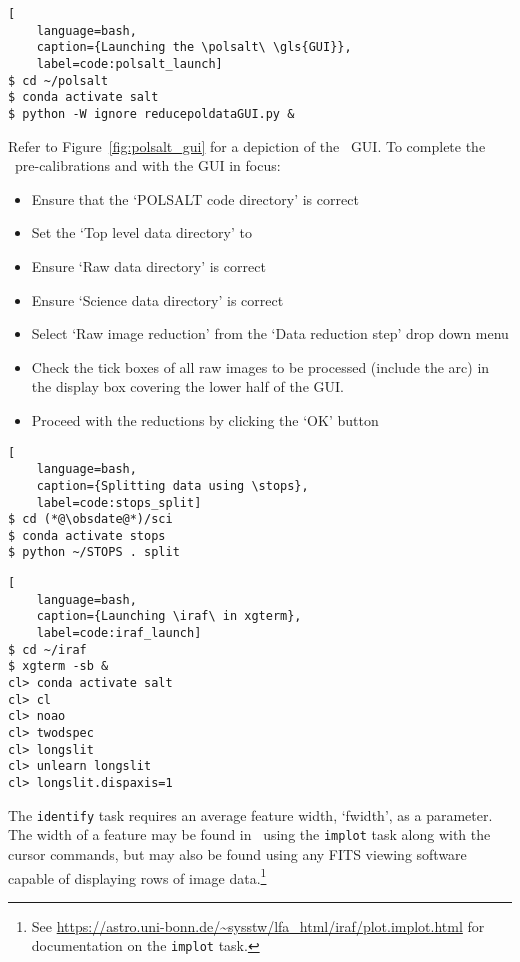 \begin{lstlisting}[
    language=bash,
    caption={Launching the \polsalt\ \gls{GUI}},
    label=code:polsalt_launch]
$ cd ~/polsalt
$ conda activate salt
$ python -W ignore reducepoldataGUI.py &
\end{lstlisting}

\noindent Refer to Figure~\ref{fig:polsalt_gui} for a depiction of the \polsalt\ \gls{GUI}. To complete the \polsalt\ pre-calibrations and with the \gls{GUI} in focus:
\begin{itemize}
    \item Ensure that the `POLSALT code directory' is correct
    \item Set the `Top level data directory' to \obsdate
    \item Ensure `Raw data directory' is correct
    \item Ensure `Science data directory' is correct
    \item Select `Raw image reduction' from the `Data reduction step' drop down menu
    \item Check the tick boxes of all raw images to be processed (include the arc) in the display box covering the lower half of the \gls{GUI}.
    \item Proceed with the reductions by clicking the `OK' button
\end{itemize}

\begin{lstlisting}[
    language=bash,
    caption={Splitting data using \stops},
    label=code:stops_split]
$ cd (*@\obsdate@*)/sci
$ conda activate stops
$ python ~/STOPS . split
\end{lstlisting}

\begin{lstlisting}[
    language=bash,
    caption={Launching \iraf\ in xgterm},
    label=code:iraf_launch]
$ cd ~/iraf
$ xgterm -sb &
cl> conda activate salt
cl> cl
cl> noao
cl> twodspec
cl> longslit
cl> unlearn longslit
cl> longslit.dispaxis=1
\end{lstlisting}

The \texttt{identify} task requires an average feature width, `fwidth', as a parameter. The width of a feature may be found in \iraf\ using the \texttt{implot} task along with the cursor commands, but may also be found using any \gls{FITS} viewing software capable of displaying rows of image data.\footnote{See \protect\url{https://astro.uni-bonn.de/~sysstw/lfa_html/iraf/plot.implot.html} for documentation on the \texttt{implot} task.}

